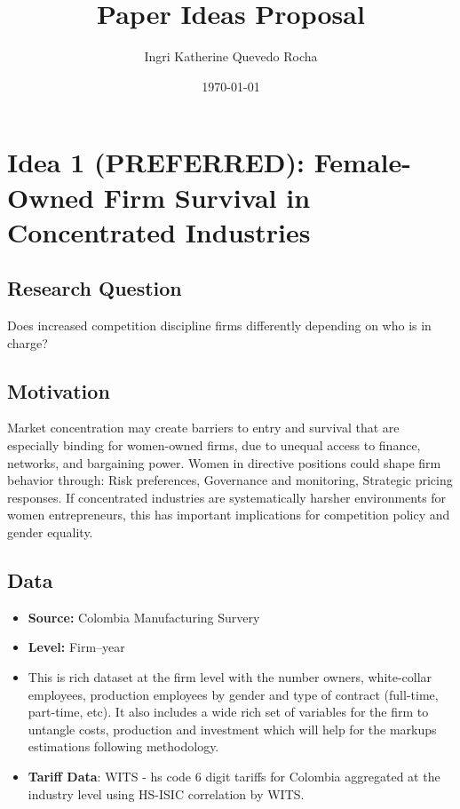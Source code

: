 \documentclass[11pt]{article}
\title{\vspace{-1.2cm}Paper Ideas Proposal}
\author{Ingri Katherine Quevedo Rocha}
\date{\today}
\begin{document}
\maketitle
\section{Idea 1 (PREFERRED): Female-Owned Firm Survival in Concentrated Industries}

\subsection*{Research Question}

Does increased competition discipline firms differently depending on who is in charge?

\subsection*{Motivation}
Market concentration may create barriers to entry and survival that are especially binding for women-owned firms, due to unequal access to finance, networks, and bargaining power. Women in directive positions could shape firm behavior through: Risk preferences, Governance and monitoring, Strategic pricing responses. If concentrated industries are systematically harsher environments for women entrepreneurs, this has important implications for competition policy and gender equality.

\subsection*{Data}
\begin{itemize}[leftmargin=*]
  \item \textbf{Source:} Colombia Manufacturing Survery
  \item \textbf{Level:} Firm--year
  \item {} This is rich dataset at the firm level with the number owners, white-collar employees, production employees by gender and type of contract (full-time, part-time, etc). It also includes a wide rich set of variables for the firm to untangle costs, production and investment which will help for the markups estimations following \cite{loecker_markups_2012} methodology.
  \item \textbf{Tariff Data}: WITS - hs code 6 digit tariffs for Colombia aggregated at the industry level using HS-ISIC correlation by WITS.
\end{itemize}
\end{document}

